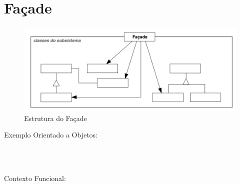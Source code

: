 \section{Façade}



\begin{figure}[htb]
	\caption{\label{facade_struct}Estrutura do Façade}
	\begin{center}
	    \includegraphics[scale=0.4]{5_padroes-contexto-funcional/5.2_estruturais/5.2.5_facade/diagram.png}
	\end{center}
\end{figure}

Exemplo Orientado a Objetos:

\begin{lstlisting}[caption={Façade Orientado a Objetos},label=oofacade]



\end{lstlisting}

Contexto Funcional:


\begin{lstlisting}[caption={Façade Funcional},label=fpfacade]
    

    
\end{lstlisting}